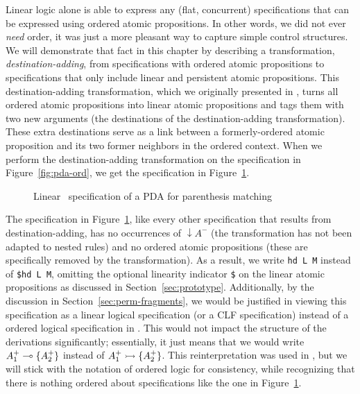 Linear logic alone is able to express any (flat, concurrent)
specifications that can be expressed using ordered atomic
propositions. In other words, we did not ever {\it need} order, it was
just a more pleasant way to capture simple control structures.
%
We will demonstrate that fact in this chapter by 
describing a transformation,
{\it destination-adding}, from specifications with ordered atomic
propositions
to specifications that only include linear and persistent atomic 
propositions. This
destination-adding transformation, which we originally presented in
\cite{simmons11logical}, turns all ordered atomic propositions into
linear atomic propositions and tags them with two new arguments (the
destinations of the destination-adding transformation). These extra
destinations serve as a link between a formerly-ordered atomic
proposition and its two former neighbors in the ordered context.  When
we perform the destination-adding transformation on the specification
in Figure~\ref{fig:pda-ord}, we get the specification in
Figure~\ref{fig:pda-lin}.

\begin{figure}[ht]
\caption{Linear \sls~specification of a PDA for parenthesis matching}
\label{fig:pda-lin}
\end{figure}

The specification in Figure~\ref{fig:pda-lin}, like every other
specification that results from destination-adding, has no occurrences
of ${\downarrow}A^-$ (the transformation has not been adapted
to nested rules) and no ordered atomic propositions (these are
specifically removed by the transformation).  As a result,
we write \verb|hd L M| instead of \verb|$hd L M|, omitting the
optional linearity indicator \verb|$| on the linear atomic
propositions as discussed in
Section~\ref{sec:prototype}. Additionally, by the discussion in
Section~\ref{sec:perm-fragments}, we would be justified in viewing
this specification as a linear logical specification (or a CLF
specification) instead of a ordered logical specification in \sls.
This would not impact the structure of the derivations significantly;
essentially, it just means that we would write $A^+_1 \multimap \{ A^+_2
\}$ instead of $A^+_1 \rightarrowtail \{ A^+_2 \}$.  This reinterpretation was
used in \cite{simmons11logical}, but we will stick with the notation
of ordered logic for consistency, while recognizing that there is
nothing ordered about specifications like the one in
Figure~\ref{fig:pda-lin}.

